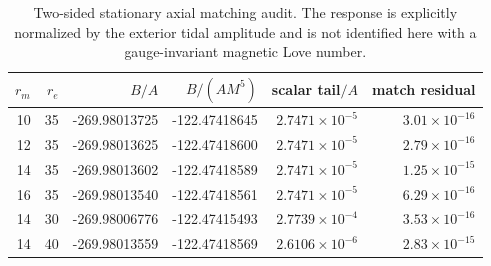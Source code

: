 \documentclass[aps,prd,preprint,onecolumn,nofootinbib,superscriptaddress,showkeys]{revtex4-2}
\begin{document}
\begin{table}[!htbp]
\centering
\caption{Two-sided stationary axial matching audit. The response is explicitly normalized by the exterior tidal amplitude and is not identified here with a gauge-invariant magnetic Love number.}
\label{tab:static-full}
\small
\begin{tabular}{@{}rrrrrr@{}}
\toprule
$r_m$ & $r_e$ & $B/A$ & $B/(AM^5)$ & scalar tail$/A$ & match residual\\
\midrule
10 & 35 & -269.98013725 & -122.47418645 & $2.7471\times10^{-5}$ & $3.01\times10^{-16}$\\
12 & 35 & -269.98013625 & -122.47418600 & $2.7471\times10^{-5}$ & $2.79\times10^{-16}$\\
14 & 35 & -269.98013602 & -122.47418589 & $2.7471\times10^{-5}$ & $1.25\times10^{-15}$\\
16 & 35 & -269.98013540 & -122.47418561 & $2.7471\times10^{-5}$ & $6.29\times10^{-16}$\\
14 & 30 & -269.98006776 & -122.47415493 & $2.7739\times10^{-4}$ & $3.53\times10^{-16}$\\
14 & 40 & -269.98013559 & -122.47418569 & $2.6106\times10^{-6}$ & $2.83\times10^{-15}$\\
\bottomrule
\end{tabular}
\end{table}
\end{document}
